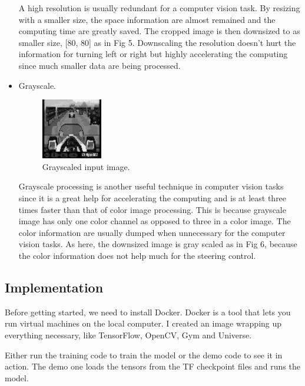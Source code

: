 \documentclass[a4paper]{article}
\begin{document}
\begin{itemize}
    A high resolution is usually redundant for a computer vision task. By resizing with a smaller size, the space information are almost remained and the computing time are greatly saved. The cropped image is then downsized to as smaller size, [80, 80] as in Fig 5. Downscaling the resolution doesn't hurt the information for turning left or right but highly accelerating the computing since much smaller data are being processed.
    
    \item Grayscale.

	\begin{figure}[h]
	\centering
	\includegraphics[width=0.25\textwidth]{coaster-racer-vision-grayscaled}
	\caption{Grayscaled input image.}
	\end{figure}
    
   Grayscale processing is another useful technique in computer vision tasks since it is a great help for accelerating the computing and is at least three times faster than that of color image processing. This is because grayscale image has only one color channel as opposed to three in a color image.  The color information are usually dumped when unnecessary for the computer vision tasks. As here, the downsized image is gray scaled as in Fig 6, because the color information does not help much for the steering control. 

\end{itemize}

\subsection{Implementation}



Before getting started, we need to install Docker. Docker is a tool that lets you run virtual machines on the local computer. I created an image wrapping up everything necessary, like TensorFlow, OpenCV, Gym and Universe.

Either run the training code to train the model or the demo code to see it in action. The demo one loads the tensors from the TF checkpoint files and runs the model.
\end{document}

